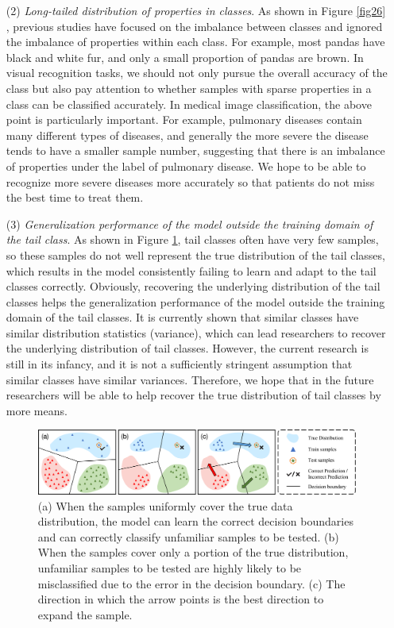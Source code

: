 \documentclass[10pt]{article} %
\begin{document}
\begin{itemize}
     \item[(2)] \emph{Long-tailed distribution of properties in classes}. As shown in Figure \ref{fig26} \cite{paper115}, previous studies have focused on the imbalance between classes and ignored the imbalance of properties within each class. For example, most pandas have black and white fur, and only a small proportion of pandas are brown. In visual recognition tasks, we should not only pursue the overall accuracy of the class but also pay attention to whether samples with sparse properties in a class can be classified accurately. In medical image classification, the above point is particularly important. For example, pulmonary diseases contain many different types of diseases, and generally the more severe the disease tends to have a smaller sample number, suggesting that there is an imbalance of properties under the label of pulmonary disease. We hope to be able to recognize more severe diseases more accurately so that patients do not miss the best time to treat them.

     \item[(3)] \emph{Generalization performance of the model outside the training domain of the tail class}. As shown in Figure \ref{fig27}, tail classes often have very few samples, so these samples do not well represent the true distribution of the tail classes, which results in the model consistently failing to learn and adapt to the tail classes correctly. Obviously, recovering the underlying distribution of the tail classes helps the generalization performance of the model outside the training domain of the tail classes. It is currently shown that similar classes have similar distribution statistics (variance), which can lead researchers to recover the underlying distribution of tail classes. However, the current research is still in its infancy, and it is not a sufficiently stringent assumption that similar classes have similar variances. Therefore, we hope that in the future researchers will be able to help recover the true distribution of tail classes by more means.

\begin{figure}[h]%
\begin{center}
\includegraphics[width=1\columnwidth]{fig1a}
\vskip -0.05in
\caption{(a) When the samples uniformly cover the true data distribution, the model can learn the correct decision boundaries and can correctly classify unfamiliar samples to be tested. (b) When the samples cover only a portion of the true distribution, unfamiliar samples to be tested are highly likely to be misclassified due to the error in the decision boundary. (c) The direction in which the arrow points is the best direction to expand the sample.}
\label{fig27}
\end{center}
\vskip -0.13in
\end{figure}


\end{itemize}
\end{document}

